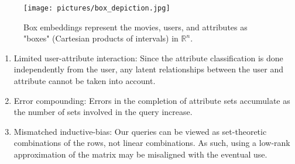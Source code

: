 \begin{figure}[]
    \centering
    \texttt{[image: pictures/box\_depiction.jpg]}
    \caption{Box embeddings represent the movies, users, and attributes as "boxes" (Cartesian products of intervals) in $\mathbb R^n$.}
    \label{fig:box_depiction}
\end{figure}



\begin{enumerate}
    \item Limited user-attribute interaction:
    Since the attribute classification is done independently from the user, any latent relationships between the user and attribute cannot be taken into account.
    \item Error compounding: Errors in the completion of attribute sets accumulate as the number of sets involved in the query increase.
    \item Mismatched inductive-bias: Our queries can be viewed as set-theoretic combinations of the rows, not linear combinations. As such, using a low-rank approximation of the matrix may be misaligned with the eventual use.
\end{enumerate}



